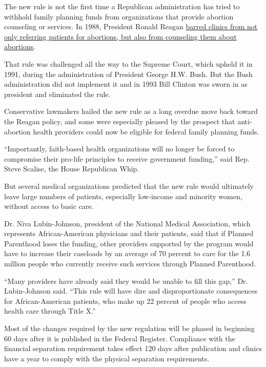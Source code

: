 The new rule is not the first time a Republican administration has tried
to withhold family planning funds from organizations that provide
abortion counseling or services. In 1988, President Ronald Reagan
\href{https://www.nytimes3xbfgragh.onion/1988/01/30/us/reagan-bars-mention-of-abortion-at-clinics-receiving-us-money.html}{barred
clinics from not only referring patients for abortions, but also from
counseling them about abortions}.

That rule was challenged all the way to the Supreme Court, which upheld
it in 1991, during the administration of President George H.W. Bush. But
the Bush administration did not implement it and in 1993 Bill Clinton
was sworn in as president and eliminated the rule.

Conservative lawmakers hailed the new rule as a long overdue move back
toward the Reagan policy, and some were especially pleased by the
prospect that anti-abortion health providers could now be eligible for
federal family planning funds.

``Importantly, faith-based health organizations will no longer be forced
to compromise their pro-life principles to receive government funding,''
said Rep. Steve Scalise, the House Republican Whip.

But several medical organizations predicted that the new rule would
ultimately leave large numbers of patients, especially low-income and
minority women, without access to basic care.

Dr. Niva Lubin-Johnson, president of the National Medical Association,
which represents African-American physicians and their patients, said
that if Planned Parenthood loses the funding, other providers supported
by the program would have to increase their caseloads by an average of
70 percent to care for the 1.6 million people who currently receive such
services through Planned Parenthood.

``Many providers have already said they would be unable to fill this
gap,'' Dr. Lubin-Johnson said. ``This rule will have dire and
disproportionate consequences for African-American patients, who make up
22 percent of people who access health care through Title X.''

Most of the changes required by the new regulation will be phased in
beginning 60 days after it is published in the Federal Register.
Compliance with the financial separation requirement takes effect 120
days after publication and clinics have a year to comply with the
physical separation requirements.

